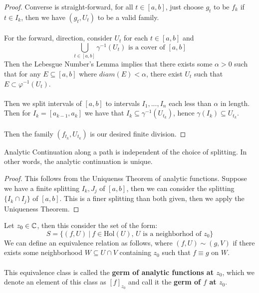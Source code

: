 \documentclass{article}
\begin{document}
\begin{proof}
    Converse is straight-forward, for all $t \in [a, b]$, just choose $g_t$ to be $f_k$ if $t \in I_k$, then we have $(g_t, U_t)$ to be a valid family.\\\\
    For the forward, direction, consider $U_t$ for each $t \in [a, b]$ and
    \[\bigcup_{t \in [a, b]} \gamma^{-1}(U_t) \text{ is a cover of } [a, b]\]
    Then the Lebesgue Number's Lemma implies that there exists some $\alpha > 0$ such that for any $E \subseteq [a, b]$ where $diam(E) < \alpha$, there exist $U_t$ such that $E \subset \varphi^{-1}(U_t)$.\\\\
    Then we split intervals of $[a, b]$ to intervals $I_1, ..., I_n$ each less than $\alpha$ in length. Then for $I_k = [a_{k-1}, a_k]$ we have that $I_k \subseteq \gamma^{-1}(U_{t_k})$, hence $\gamma(I_k) \subseteq U_{t_k}$.\\\\
    Then the family $(f_{t_k}, U_{t_k})$ is our desired finite division.
\end{proof}

\begin{proposition}
    Analytic Continuation along a path is independent of the choice of splitting. In other words, the analytic continuation is unique.
\end{proposition}

\begin{proof}
    This follows from the Uniquenss Theorem of analytic functions. Suppose we have a finite splitting ${I_k}, {J_j}$ of $[a, b]$, then we can consider the splitting $\{I_k \cap I_j\}$ of $[a, b]$. This is a finer splitting than both given, then we apply the Uniqueness Theorem.
\end{proof}

\begin{definition}
    Let $z_0 \in \mathbb{C}$, then this consider the set of the form:
    \[S = \{(f, U)\ |\ \text{$f \in \text{Hol}(U)$, $U$ is a neighborhod of $z_0$}\}\]
    We can define an equivalence relation as follows, where $(f, U) \sim (g, V)$ if there exists some neighborhood $W \subseteq U \cap V$ containing $z_0$ such that $f \equiv g$ on $W$.\\\\
    This equivalence class is called the \textbf{germ of analytic functions at $z_0$}, which we denote an element of this class as $[f]_{z_0}$ and call it the \textbf{germ of $f$ at $z_0$}.
\end{definition}
\end{document}
